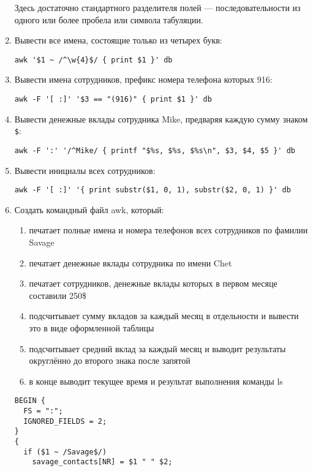 \documentclass[listings]{labreport}
\begin{document}
\begin{enumerate}
\begin{small}
  Здесь достаточно стандартного разделителя полей — последовательности
  из одного или более пробела или символа табуляции.
\end{small}

\item Вывести все имена, состоящие только из четырех букв:
\begin{verbatim}
awk '$1 ~ /^\w{4}$/ { print $1 }' db
\end{verbatim}

\item Вывести имена сотрудников, префикс номера телефона которых 916:
\begin{verbatim}
awk -F '[ :]' '$3 == "(916)" { print $1 }' db
\end{verbatim}

\item Вывести денежные вклады сотрудника Mike, предваряя каждую сумму знаком \verb|$|:
\begin{verbatim}
awk -F ':' '/^Mike/ { printf "$%s, $%s, $%s\n", $3, $4, $5 }' db
\end{verbatim}

\item Вывести инициалы всех сотрудников:
\begin{verbatim}
awk -F '[ :]' '{ print substr($1, 0, 1), substr($2, 0, 1) }' db
\end{verbatim}

\item Создать командный файл awk, который: 
\begin{enumerate}
\item печатает полные имена и номера телефонов всех сотрудников по фамилии Savage
\item печатает денежные вклады сотрудника по имени Chet
\item печатает сотрудников, денежные вклады которых в первом месяце составили 250\$
\item подсчитывает сумму вкладов за каждый месяц в отдельности и вывести это в виде оформленной таблицы
\item подсчитывает средний вклад за каждый месяц и выводит результаты округлённо до второго знака после запятой
\item в конце выводит текущее время и результат выполнения команды ls
\end{enumerate}

\begin{verbatim}
BEGIN {
  FS = ":";
  IGNORED_FIELDS = 2;
}
{
  if ($1 ~ /Savage$/)
    savage_contacts[NR] = $1 " " $2;


\end{verbatim}
\end{enumerate}
\end{document}
